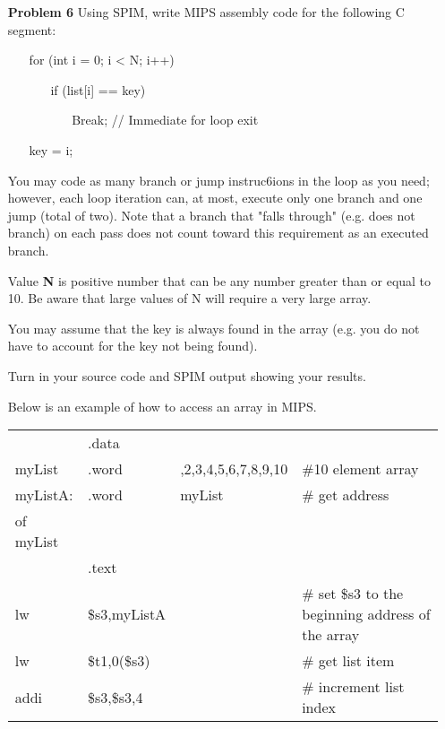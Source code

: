 \documentclass[12pt]{article}
\begin{document}
\begin{enumerate}
  \item[\textbf{Problem 6}] Using SPIM, write MIPS assembly code for the following C segment:
  \begin{enumerate}\ttfamily
    \item[] for (int i = 0; i < N; i++)
    \begin{enumerate}
      \item[] if (list[i] == key)
      \begin{enumerate}
        \item[] Break; // Immediate for loop exit
      \end{enumerate}
    \end{enumerate}
    \item[] key = i;
  \end{enumerate}

  \item[] You may code as many branch or jump instruc6ions in the loop as you need; however, each loop iteration can, at most, execute only one branch and one jump (total of two). Note that a branch that "falls through" (e.g. does not branch) on each pass does not count toward this requirement as an executed branch.

  \item[] Value \textbf{N} is positive number that can be any number greater than or equal to 10. Be aware that large values of N will require a very large array.

  \item[] You may assume that the key is always found in the array (e.g. you do not have to account for the key not being found).

	\item[] Turn in your source code and SPIM output showing your results.

  \item[] Below is an example of how to access an array in MIPS.

  \begin{tabular}{>{\ttfamily}p{4em}>{\ttfamily}p{5em}>{\ttfamily}p{10em}>{\ttfamily}p{10em}}
              & .data	  & & \\
    myList    & .word	  & 1,2,3,4,5,6,7,8,9,10 & \#10 element array \\
    myListA:  & .word   & myList & \# get address \\
    of myList &       	&        & \\
              & .text	  &        & \\
    lw		    & \$s3,myListA &	& \# set \$s3 to the beginning address of the array \\
    lw        & \$t1,0(\$s3)	& & \# get list item \\
    addi      & \$s3,\$s3,4 	& & \# increment list index \\
  \end{tabular}


\end{enumerate}
\end{document}
